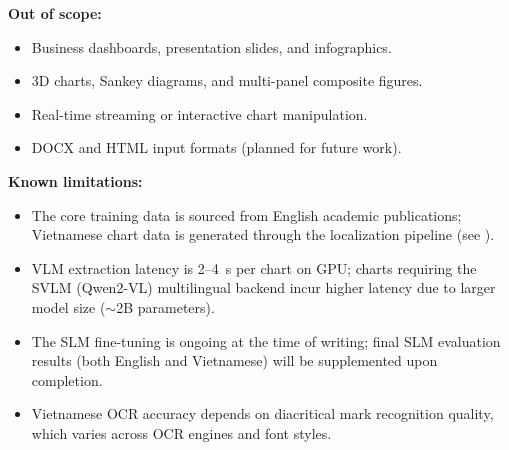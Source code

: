 \textbf{Out of scope:}
\begin{itemize}
    \item Business dashboards, presentation slides, and infographics.
    \item 3D charts, Sankey diagrams, and multi-panel composite figures.
    \item Real-time streaming or interactive chart manipulation.
    \item DOCX and HTML input formats (planned for future work).
\end{itemize}

\textbf{Known limitations:}
\begin{itemize}
    \item The core training data is sourced from English academic publications; Vietnamese
          chart data is generated through the localization pipeline (see ).
    \item VLM extraction latency is 2--4~s per chart on GPU; charts requiring the
          SVLM (Qwen2-VL) multilingual backend incur higher latency due to larger
          model size ($\sim$2B parameters).
    \item The SLM fine-tuning is ongoing at the time of writing; final SLM evaluation
          results (both English and Vietnamese) will be supplemented upon completion.
    \item Vietnamese OCR accuracy depends on diacritical mark recognition quality,
          which varies across OCR engines and font styles.
\end{itemize}

